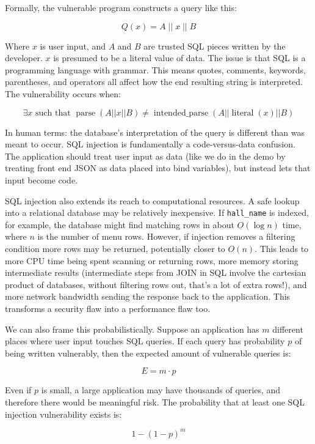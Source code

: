\documentclass[12pt]{article}
\begin{document}
Formally, the vulnerable program constructs a query like this:

\[
Q(x) = A \; || \; x \; || \; B
\]

Where \(x\) is user input, and \(A\) and \(B\) are trusted SQL pieces written by the developer. \(x\) is presumed to be a literal value of data. The issue is that SQL is a programming language with grammar. This means quotes, comments, keywords, parentheses, and operators all affect how the end resulting string is interpreted. The vulnerability occurs when:

\[
\exists x \text{ such that }
\operatorname{parse}(A || x || B)
\neq
\operatorname{intended\_parse}(A || \operatorname{literal}(x) || B)
\]

In human terms: the database’s interpretation of the query is different than was meant to occur. SQL injection is fundamentally a code-versus-data confusion. The application should treat user input as data (like we do in the demo by treating front end JSON as data placed into bind variables), but instead lets that input become code.

SQL injection also extends its reach to computational resources. A safe lookup into a relational database may be relatively inexpensive. If \texttt{hall\_name} is indexed, for example, the database might find matching rows in about \(O(\log n)\) time, where \(n\) is the number of menu rows. However, if injection removes a filtering condition more rows may be returned, potentially closer to \(O(n)\). This leads to more CPU time being spent scanning or returning rows, more memory storing intermediate results (intermediate steps from JOIN in SQL involve the cartesian product of databases, without filtering rows out, that’s a lot of extra rows!), and more network bandwidth sending the response back to the application. This transforms a security flaw into a performance flaw too.

We can also frame this probabilistically. Suppose an application has \(m\) different places where user input touches SQL queries. If each query has probability \(p\) of being written vulnerably, then the expected amount of vulnerable queries is:

\[
E = m \cdot p
\]

Even if \(p\) is small, a large application may have thousands of queries, and therefore there would be meaningful risk. The probability that at least one SQL injection vulnerability exists is:

\[
1 - (1 - p)^m
\]
\end{document}
